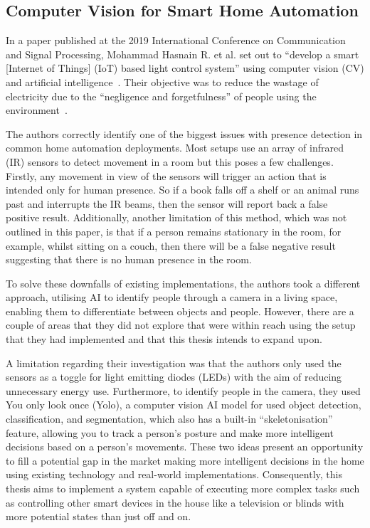 \subsection{Computer Vision for Smart Home Automation}
In a paper published at the 2019 International Conference on Communication and Signal Processing, Mohammad Hasnain R. et al. set out to ``develop a smart [Internet of Things] (IoT) based light control system'' using computer vision (CV) and artificial intelligence~\cite{Hasn19}.
Their objective was to reduce the wastage of electricity due to the ``negligence and forgetfulness'' of people using the environment~\cite{Hasn19}.

The authors correctly identify one of the biggest issues with presence detection in common home automation deployments.
Most setups use an array of infrared (IR) sensors to detect movement in a room but this poses a few challenges.
Firstly, any movement in view of the sensors will trigger an action that is intended only for human presence.
So if a book falls off a shelf or an animal runs past and interrupts the IR beams, then the sensor will report back a false positive result.
Additionally, another limitation of this method, which was not outlined in this paper, is that if a person remains stationary in the room, for example, whilst sitting on a couch, then there will be a false negative result suggesting that there is no human presence in the room.

To solve these downfalls of existing implementations, the authors took a different approach, utilising AI to identify people through a camera in a living space, enabling them to differentiate between objects and people.
However, there are a couple of areas that they did not explore that were within reach using the setup that they had implemented and that this thesis intends to expand upon.

A limitation regarding their investigation was that the authors only used the sensors as a toggle for light emitting diodes (LEDs) with the aim of reducing unnecessary energy use.
Furthermore, to identify people in the camera, they used You only look once (Yolo), a computer vision AI model for used object detection, classification, and segmentation, which also has a built-in ``skeletonisation'' feature, allowing you to track a person's posture and make more intelligent decisions based on a person's movements.
These two ideas present an opportunity to fill a potential gap in the market making more intelligent decisions in the home using existing technology and real-world implementations.
Consequently, this thesis aims to implement a system capable of executing more complex tasks such as controlling other smart devices in the house like a television or blinds with more potential states than just off and on.

